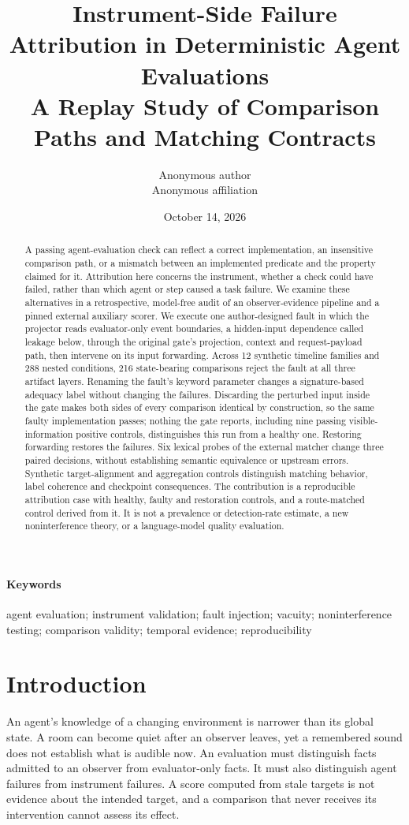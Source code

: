 \documentclass[11pt]{article}
\title{Instrument-Side Failure Attribution in Deterministic Agent Evaluations\\
\large A Replay Study of Comparison Paths and Matching Contracts}
\author{Anonymous author\\Anonymous affiliation}
\date{October 14, 2026}
\begin{document}
\maketitle
\begin{abstract}
A passing agent-evaluation check can reflect a correct implementation, an insensitive comparison path, or a mismatch between an implemented predicate and the property claimed for it. Attribution here concerns the instrument, whether a check could have failed, rather than which agent or step caused a task failure. We examine these alternatives in a retrospective, model-free audit of an observer-evidence pipeline and a pinned external auxiliary scorer. We execute one author-designed fault in which the projector reads evaluator-only event boundaries, a hidden-input dependence called leakage below, through the original gate's projection, context and request-payload path, then intervene on its input forwarding. Across 12 synthetic timeline families and 288 nested conditions, 216 state-bearing comparisons reject the fault at all three artifact layers. Renaming the fault's keyword parameter changes a signature-based adequacy label without changing the failures. Discarding the perturbed input inside the gate makes both sides of every comparison identical by construction, so the same faulty implementation passes; nothing the gate reports, including nine passing visible-information positive controls, distinguishes this run from a healthy one. Restoring forwarding restores the failures. Six lexical probes of the external matcher change three paired decisions, without establishing semantic equivalence or upstream errors. Synthetic target-alignment and aggregation controls distinguish matching behavior, label coherence and checkpoint consequences. The contribution is a reproducible attribution case with healthy, faulty and restoration controls, and a route-matched control derived from it. It is not a prevalence or detection-rate estimate, a new noninterference theory, or a language-model quality evaluation.
\end{abstract}
\paragraph{Keywords} agent evaluation; instrument validation; fault injection; vacuity; noninterference testing; comparison validity; temporal evidence; reproducibility

\section{Introduction}
An agent's knowledge of a changing environment is narrower than its global state. A room can become quiet after an observer leaves, yet a remembered sound does not establish what is audible now. An evaluation must distinguish facts admitted to an observer from evaluator-only facts. It must also distinguish agent failures from instrument failures. A score computed from stale targets is not evidence about the intended target, and a comparison that never receives its intervention cannot assess its effect.
\end{document}
